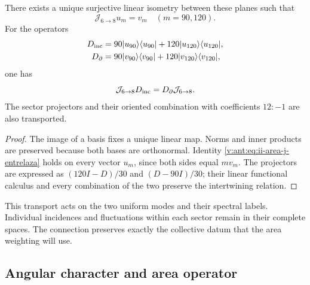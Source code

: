 \begin{theorem}
\label{v:ant:thm:ii-area-entrelazamiento-colectivo}
There exists a unique surjective linear isometry between these planes such that
\begin{equation}
 \mathcal J_{6\to8}u_m=v_m\quad(m=90,120).
 \label{v:ant:eq:ii-area-j-colectivo}
\end{equation}
For the operators
\[
 \begin{aligned}
 D_{\rm inc}&=90|u_{90}\rangle\langle u_{90}|
             +120|u_{120}\rangle\langle u_{120}|,\\
 D_\partial&=90|v_{90}\rangle\langle v_{90}|
             +120|v_{120}\rangle\langle v_{120}|,
 \end{aligned}
\]
one has
\begin{equation}
 \mathcal J_{6\to8}D_{\rm inc}
 =D_\partial\mathcal J_{6\to8}.
 \label{v:ant:eq:ii-area-j-entrelaza}
\end{equation}
The sector projectors and their oriented combination with coefficients
\(12:-1\) are also transported.
\end{theorem}
\begin{proof}
The image of a basis fixes a unique linear map. Norms and
inner products are preserved because both bases are orthonormal.
Identity \eqref{v:ant:eq:ii-area-j-entrelaza} holds on every vector
\(u_m\), since both sides equal \(m v_m\). The projectors are
expressed as \((120I-D)/30\) and \((D-90I)/30\); their linear functional
calculus and every combination of the two preserve the intertwining relation.
\end{proof}

This transport acts on the two uniform modes and their spectral
labels. Individual incidences and fluctuations within
each sector remain in their complete spaces. The connection preserves
exactly the collective datum that the area weighting will use.

\subsection{Angular character and area operator}
\label{v:ant:sec:ii-area-caracter}

